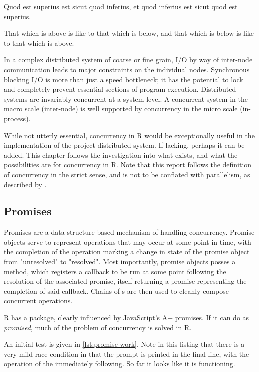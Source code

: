 \begin{displayquote}
Quod est superius est sicut quod inferius, et quod inferius est sicut quod est superius.

That which is above is like to that which is below, and that which is below is like to that which is above.
\end{displayquote}

In a complex distributed system of coarse or fine grain, I/O by way of inter-node communication leads to major constraints on the individual nodes.
Synchronous blocking I/O is more than just a speed bottleneck; it has the potential to lock and completely prevent essential sections of program execution.
Distributed systems are invariably concurrent at a system-level.
A concurrent system in the macro scale (inter-node) is well supported by concurrency in the micro scale (in-process).

While not utterly essential, concurrency in R would be exceptionally useful in the implementation of the project distributed system.
If lacking, perhaps it can be added.
This chapter follows the investigation into what exists, and what the possibilities are for concurrency in R.
Note that this report follows the definition of concurrency in the strict sense, and is not to be conflated with parallelism, as described by \textcite{pike2012concurrency}.

\subsection{Promises}

Promises are a data structure-based mechanism of handling concurrency\cite{liskov1988promises}.
Promise objects serve to represent operations that may occur at some point in time, with the completion of the operation marking a change in state of the promise object from "unresolved" to "resolved".
Most importantly, promise objects posses a  method, which registers a callback to be run at some point following the resolution of the associated promise, itself returning a promise representing the completion of said callback.
Chains of s are then used to cleanly compose concurrent operations.

R has a  package, clearly influenced by JavaScript's A+ promises\cite{cheng2021promises}.
If it can do as \textit{promised}, much of the problem of concurrency is solved in R.

An initial test is given in \cref{lst:promise-work}.
Note in this listing that there is a very mild race condition in that the prompt is printed in the final line, with the operation of the  immediately following.
So far it looks like it is functioning.

